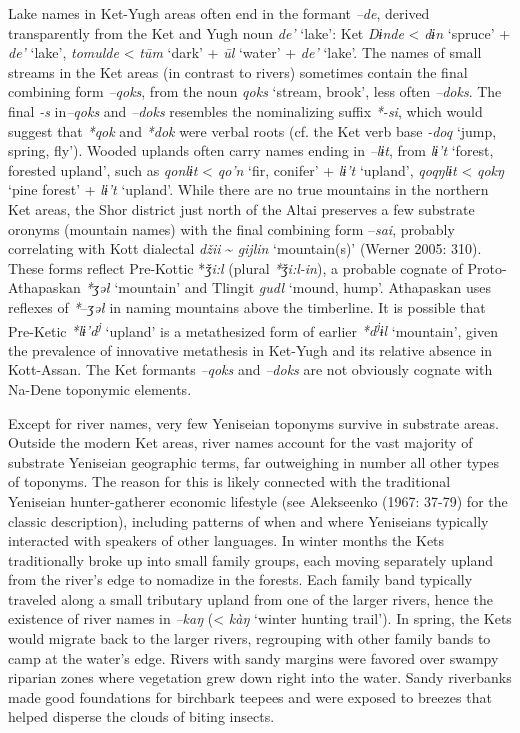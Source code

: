 Lake names in Ket-Yugh areas often end in the formant \textit{–de}, derived transparently from the Ket and Yugh noun \textit{de’} ‘lake’: Ket \textit{Dɨnde} {\textless} \textit{dɨn} ‘spruce’ + \textit{de’} ‘lake’, \textit{tomulde} {\textless} \textit{t\=um} ‘dark’ + \textit{\=ul} ‘water’ + \textit{de’} ‘lake’. The names of small streams in the Ket areas (in contrast to rivers) sometimes contain the final combining form \textit{–qoks}, from the noun \textit{qoks} ‘stream, brook’, less often \textit{–doks}. The final \textit{{}-s} in\textit{–qoks} and \textit{–doks} resembles the nominalizing suffix \textit{*-si}, which would suggest that \textit{*qok} and \textit{*dok} were verbal roots (cf. the Ket verb base\textit{ -doq} ‘jump, spring, fly’). Wooded uplands often carry names ending in \textit{–lɨt}, from \textit{lɨ’t }‘forest, forested upland’, such as \textit{qonlɨt} {\textless} \textit{qo’n} ‘fir, conifer’ + \textit{lɨ’t }‘upland’, \textit{qoqŋlɨt} {\textless} \textit{qokŋ} ‘pine forest’ + \textit{lɨ’t }‘upland’. While there are no true mountains in the northern Ket areas, the Shor district just north of the Altai preserves a few substrate oronyms (mountain names) with the final combining form –\textit{sai}, probably correlating with Kott dialectal \textit{džii} \~{} \textit{gijlin} ‘mountain(s)’ (Werner 2005: 310). These forms reflect Pre-Kottic *\textit{ǯi:l} (plural\textit{ *ǯi:l-in}), a probable cognate of Proto-Athapaskan \textit{*ʒəł} ‘mountain’ and Tlingit \textit{gudl} ‘mound, hump’. Athapaskan uses reflexes of \textit{*}–\textit{ʒəł} in naming mountains above the timberline. It is possible that Pre-Ketic \textit{*lɨ’d}\textit{\textsuperscript{j}} ‘upland’ is a metathesized form of earlier \textit{*d}\textit{\textsuperscript{j}}\textit{ɨl} ‘mountain’, given the prevalence of innovative metathesis in Ket-Yugh and its relative absence in Kott-Assan. The Ket formants \textit{–qoks} and \textit{–doks }are not obviously cognate with Na-Dene toponymic elements.

Except for river names, very few Yeniseian toponyms survive in substrate areas. Outside the modern Ket areas, river names account for the vast majority of substrate Yeniseian geographic terms, far outweighing in number all other types of toponyms. The reason for this is likely connected with the traditional Yeniseian hunter-gatherer economic lifestyle (see Alekseenko (1967: 37-79) for the classic description), including patterns of when and where Yeniseians typically interacted with speakers of other languages. In winter months the Kets traditionally broke up into small family groups, each moving separately upland from the river’s edge to nomadize in the forests. Each family band typically traveled along a small tributary upland from one of the larger rivers, hence the existence of river names in \textit{–kaŋ} ({\textless} \textit{kàŋ} ‘winter hunting trail’). In spring, the Kets would migrate back to the larger rivers, regrouping with other family bands to camp at the water’s edge. Rivers with sandy margins were favored over swampy riparian zones where vegetation grew down right into the water. Sandy riverbanks made good foundations for birchbark teepees and were exposed to breezes that helped disperse the clouds of biting insects.

